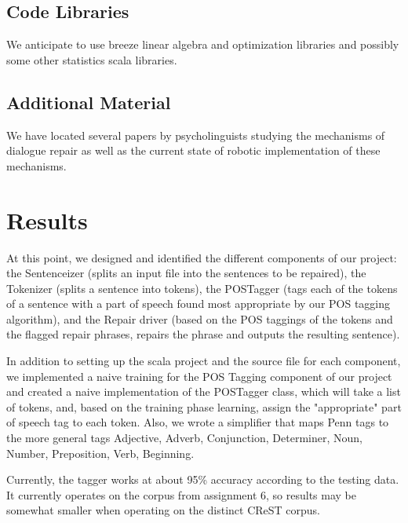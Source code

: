 \documentclass{article}
\begin{document}
\begin{flushleft}
\begin{flushleft}
\begin{flushleft}
\end{flushleft}

\subsection{Code Libraries}

\begin{flushleft}
We anticipate to use breeze linear algebra and optimization libraries and possibly some other statistics scala libraries.
\end{flushleft}

\subsection{Additional Material}

We have located several papers by psycholinguists studying the mechanisms of dialogue repair as well as the current state of robotic implementation of these mechanisms.

\section{Results}

\begin {flushleft}

At this point, we designed and identified the different components of our project: the Sentenceizer (splits an input file into the sentences to be repaired), the Tokenizer (splits a sentence into tokens), the POSTagger (tags each of the tokens of a sentence with a part of speech found most appropriate by our POS tagging algorithm), and the Repair driver (based on the POS taggings of the tokens and the flagged repair phrases, repairs the phrase and outputs the resulting sentence).

\end {flushleft}

\begin {flushleft}

 In addition to setting up the scala project and the source file for each component, we implemented a naive training for the POS Tagging component of our project and created a naive implementation of the POSTagger class, which will take a list of tokens, and, based on the training phase learning, assign the "appropriate" part of speech tag to each token. Also, we wrote a simplifier that maps Penn tags to the more general tags {Adjective, Adverb, Conjunction, Determiner, Noun, Number, Preposition, Verb, Beginning}.

 Currently, the tagger works at about 95\% accuracy according to the testing data. It currently operates on the corpus from assignment 6, so results may be somewhat smaller when operating on the distinct CReST corpus.
 
 \end{flushleft}
\end{document}

